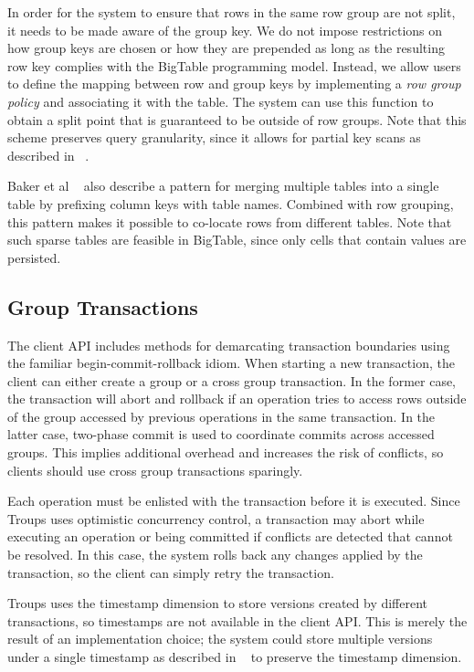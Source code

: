 \documentclass[10pt,final,journal]{IEEEtran}
\begin{document}
In order for the system to ensure that rows in the same row group are not split, it needs to be made aware of the group key. We do not impose restrictions on how group keys are chosen or how they are prepended as long as the resulting row key complies with the BigTable programming model. Instead, we allow users to define the mapping between row and group keys by implementing a \emph{row group policy} and associating it with the table. The system can use this function to obtain a split point that is guaranteed to be outside of row groups. Note that this scheme preserves query granularity, since it allows for partial key scans as described in ~\cite{George:2011}.

Baker et al ~\cite{Baker:2011:8530095} also describe a pattern for merging multiple tables into a single table by prefixing column keys with table names. Combined with row grouping, this pattern makes it possible to co-locate rows from different tables. Note that such sparse tables are feasible in BigTable, since only cells that contain values are persisted.

\subsection{Group Transactions}
The client API includes methods for demarcating transaction boundaries using the familiar begin-commit-rollback idiom. When starting a new transaction, the client can either create a group or a cross group transaction. In the former case, the transaction will abort and rollback if an operation tries to access rows outside of the group accessed by previous operations in the same transaction. In the latter case, two-phase commit is used to coordinate commits across accessed groups. This implies additional overhead and increases the risk of conflicts, so clients should use cross group transactions sparingly.

Each operation must be enlisted with the transaction before it is executed. Since Troups uses optimistic concurrency control, a transaction may abort while executing an operation or being committed if conflicts are detected that cannot be resolved. In this case, the system rolls back any changes applied by the transaction, so the client can simply retry the transaction.

Troups uses the timestamp dimension to store versions created by different transactions, so timestamps are not available in the client API. This is merely the result of an implementation choice; the system could store multiple versions under a single timestamp as described in ~\cite{Peng:2010:LIP:1924943.1924961} to preserve the timestamp dimension.
\end{document}
